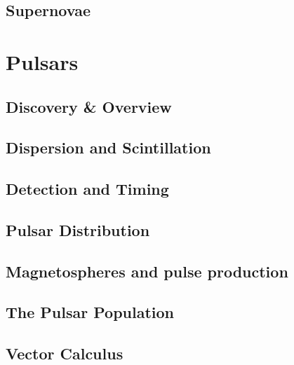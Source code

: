 \documentclass{momento}
\begin{document}


\chapter{Supernovae}
\label{cha:supernovae}



\part{Pulsars}
\label{part:pulsars}

\chapter{Discovery \& Overview}
\label{cha:discovery--overview}


\chapter{Dispersion and Scintillation}
\label{cha:disp-scint}


\chapter{Detection and Timing}
\label{cha:detection-timing}


\chapter{Pulsar Distribution}
\label{cha:pulsar-distribution}


\chapter{Magnetospheres and pulse production}
\label{cha:magn-pulse-prod}


\chapter{The Pulsar Population}
\label{cha:pulsar-population}


\appendices

\chapter{Vector Calculus}
\label{cha:vector-calculus}






\nocite{*}
\end{document}
